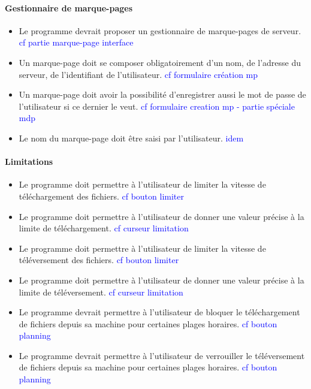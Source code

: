 \documentclass[10pt,a4paper]{report}
\begin{document}
\paragraph{Gestionnaire de marque-pages}
	\begin{itemize}[label = $\triangleright$]
		\item Le programme devrait proposer un gestionnaire de marque-pages de serveur. \textcolor{blue}{cf partie marque-page interface}
		\item Un marque-page doit se composer obligatoirement d'un nom, de l'adresse du serveur, de l'identifiant de l'utilisateur. \textcolor{blue}{cf formulaire création mp}
		\item Un marque-page doit avoir la possibilité d'enregistrer aussi le mot de passe de l'utilisateur si ce dernier le veut. \textcolor{blue}{cf formulaire creation mp - partie spéciale mdp}
		\item Le nom du marque-page doit être saisi par l'utilisateur. \textcolor{blue}{idem}
	\end{itemize}
	
\paragraph{Limitations}
	\begin{itemize}[label = $\triangleright$]
		\item Le programme doit permettre à l'utilisateur de limiter la vitesse de téléchargement des fichiers. \textcolor{blue}{cf bouton limiter}
		\item Le programme doit permettre à l'utilisateur de donner une valeur précise à la limite de téléchargement. \textcolor{blue}{cf curseur limitation}
		\item Le programme doit permettre à l'utilisateur de limiter la vitesse de téléversement des fichiers. \textcolor{blue}{cf bouton limiter}
		\item Le programme doit permettre à l'utilisateur de donner une valeur précise à la limite de téléversement. \textcolor{blue}{cf curseur limitation}
		\item Le programme devrait permettre à l'utilisateur de bloquer le téléchargement de fichiers depuis sa machine pour certaines plages horaires. \textcolor{blue}{cf bouton planning}
		\item Le programme devrait permettre à l'utilisateur de verrouiller le téléversement de fichiers depuis sa machine pour certaines plages horaires. \textcolor{blue}{cf bouton planning}
	\end{itemize}
	
\end{document}
